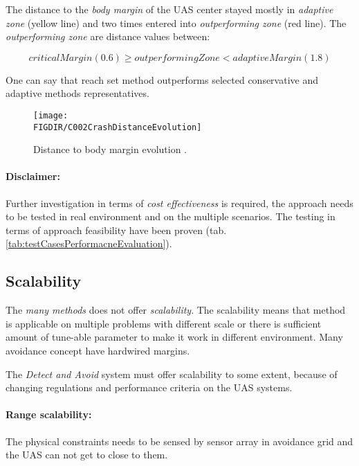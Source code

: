 The distance to the \emph{body margin} of the UAS center stayed mostly in \emph{adaptive zone} (yellow line) and two times entered into \emph{outperforming zone} (red line). The \emph{outperforming zone} are distance values between:

\begin{equation*}
    critical Margin (0.6) \ge outperforming Zone < adaptive Margin (1.8)   
\end{equation*}

One can say that reach set method outperforms selected conservative and adaptive methods representatives.

\begin{figure}[H]
    \centering
    \texttt{[image: \\FIGDIR/C002CrashDistanceEvolution]} 
    \caption{Distance to body margin evolution \cite{hrdlik2018}.}
    \label{fig:crashDistanceEvolution}
\end{figure}

\paragraph{Disclaimer:} Further investigation in terms of \emph{cost effectiveness} is required, the approach needs to be tested in real environment and on the multiple scenarios. The testing in terms of approach feasibility have been proven (tab. \ref{tab:testCasesPerformacneEvaluation}).

\subsection{Scalability}\label{s:conclusionScalability}
\noindent The \emph{many methods} does not offer \emph{scalability}. The scalability means that method is applicable on multiple problems with different scale or there is sufficient amount of tune-able parameter to make it work in different environment. Many avoidance concept have hardwired margins. 

The \emph{Detect and Avoid} system must offer scalability to some extent, because of changing regulations and performance criteria on the UAS systems.

\paragraph{Range scalability:} The physical constraints needs to be sensed by sensor array in avoidance grid and the UAS can not get to close to them. 

